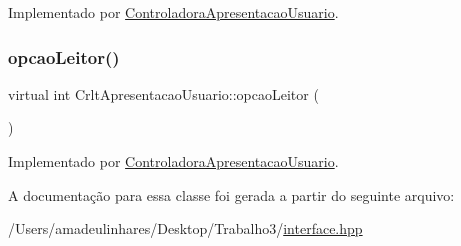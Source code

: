 Implementado por \mbox{\hyperlink{class_controladora_apresentacao_usuario_a1d9f2e8522d9e0eefaf08caca98008c2}{Controladora\+Apresentacao\+Usuario}}.

\mbox{\label{class_crlt_apresentacao_usuario_a627dcf5329233dee6ef2888dacf8a5a1}} 
\subsubsection{\texorpdfstring{opcao\+Leitor()}{opcaoLeitor()}}
{\footnotesize\ttfamily virtual int Crlt\+Apresentacao\+Usuario\+::opcao\+Leitor (\begin{DoxyParamCaption}{ }\end{DoxyParamCaption})\hspace{0.3cm}{\ttfamily [pure virtual]}}



Implementado por \mbox{\hyperlink{class_controladora_apresentacao_usuario_a22b31c99a738845f00ec2703c1c6dded}{Controladora\+Apresentacao\+Usuario}}.



A documentação para essa classe foi gerada a partir do seguinte arquivo\+:\begin{DoxyCompactItemize}
\item 
/\+Users/amadeulinhares/\+Desktop/\+Trabalho3/\mbox{\hyperlink{interface_8hpp}{interface.\+hpp}}\end{DoxyCompactItemize}
